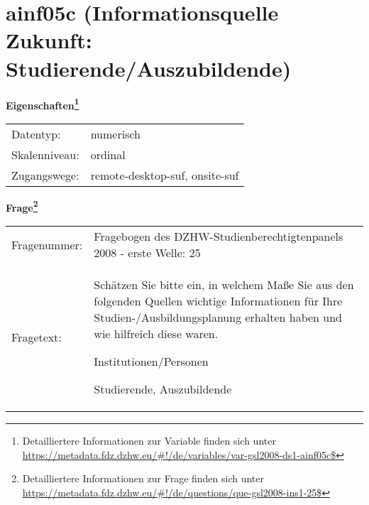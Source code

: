 
    \setcounter{footnote}{0}

    \vspace*{-1.8cm}
	\section{ainf05c (Informationsquelle Zukunft: Studierende/Auszubildende)}
	\label{section:ainf05c}



    \vspace*{0.5cm}
    \noindent\textbf{Eigenschaften\footnote{Detailliertere Informationen zur Variable finden sich unter
		\url{https://metadata.fdz.dzhw.eu/\#!/de/variables/var-gsl2008-ds1-ainf05c$}}}\\
	\begin{tabularx}{\hsize}{@{}lX}
	Datentyp: & numerisch \\
	Skalenniveau: & ordinal \\
	Zugangswege: &
	  remote-desktop-suf, 
	  onsite-suf
 \\
    \end{tabularx}



				\vspace*{0.5cm}
                \noindent\textbf{Frage\footnote{Detailliertere Informationen zur Frage finden sich unter
		              \url{https://metadata.fdz.dzhw.eu/\#!/de/questions/que-gsl2008-ins1-25$}}}\\
				\begin{tabularx}{\hsize}{@{}lX}
					Fragenummer: &
					  Fragebogen des DZHW-Studienberechtigtenpanels 2008 - erste Welle:
					  25
 \\
					Fragetext: & Schätzen Sie bitte ein, in welchem Maße Sie aus den folgenden Quellen wichtige Informationen für Ihre Studien-/Ausbildungsplanung erhalten haben und wie hilfreich diese waren.\par  Institutionen/Personen\par  Studierende, Auszubildende \\
				\end{tabularx}





